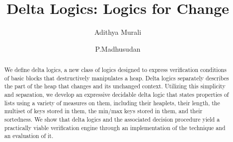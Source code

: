 \documentclass{llncs}
\begin{document}
\newcommand{\HLS}{\textit{HLS}}
\newcommand{\sem}[1]{\llbracket #1 \rrbracket}
\newcommand{\vect}[1]{\overline{#1}}
\pagestyle{plain} %

\title{Delta Logics: Logics for Change}
\author{Adithya Murali \and
  P.\@ Madhusudan
}


\maketitle

\begin{abstract}
We define delta logics, a new class of logics designed to express verification conditions
of basic blocks that destructively manipulates a heap. Delta logics separately describes the part of the heap that changes
and its unchanged context. Utilizing this simplicity and separation, we develop an expressive decidable
delta logic that states properties of lists using a variety of measures on them, including their heaplets, 
their length, the multiset of keys stored in them, the min/max keys stored in them, and their sortedness. We show that 
delta logics and the associated decision procedure yield a practically viable verification engine through an 
implementation of the technique and an evaluation of it.
\end{abstract}











\end{document}
